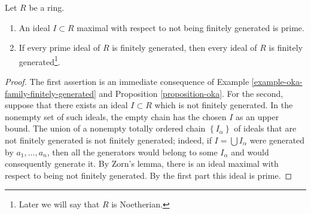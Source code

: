 \begin{lemma}
\label{lemma-cohen}
Let $R$ be a ring.
\begin{enumerate}
\item An ideal $I \subset R$ maximal with respect to not being
finitely generated is prime.
\item If every prime ideal of $R$ is
finitely generated, then
every ideal of $R$ is finitely generated\footnote{Later we will say
that $R$ is Noetherian.}.
\end{enumerate}
\end{lemma}

\begin{proof}
The first assertion is an immediate consequence of
Example \ref{example-oka-family-finitely-generated} and
Proposition \ref{proposition-oka}. For the second,
suppose that there exists an ideal $I \subset R$ which is not finitely
generated. In the nonempty set of such ideals, the empty chain
has the chosen $I$ as an upper bound. The union of a nonempty totally ordered chain $\left\{I_\alpha\right\}$
of ideals that are not finitely generated is not finitely generated;
indeed, if $I = \bigcup I_\alpha$ were generated by
$a_1, \ldots, a_n$, then all the generators would belong to some
$I_\alpha $ and would consequently generate it.
By Zorn's lemma, there is an ideal maximal with respect to being not finitely
generated. By the first part this ideal is prime.
\end{proof}